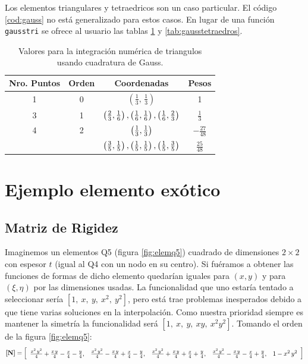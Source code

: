 Los elementos triangulares y tetraedricos son un caso particular. El código \ref{cod:gauss} no está generalizado para estos casos. En lugar de una función \texttt{gausstri} se ofrece al usuario las tablas \ref{tab:gausstriangulos} y \ref{tab:gausstetraedros}.


\begin{table}[htb!]
	\centering
	\begin{tabular}{cccc}
		Nro. Puntos & Orden & Coordenadas & Pesos \\ \hline \hline
		1 & 0 & \( \left(\frac{1}{3}, \,\frac{1}{3} \right)\) & 1 \\ [1pt] \hline
		3 & 1 & \(  \left(\frac{2}{3},\frac{1}{6}\right), \left(\frac{1}{6},\frac{1}{6}\right), \left(\frac{1}{6},\frac{2}{3} \right) \) & \( \frac{1}{3}\) \\ [2pt]\hline
		4 & 2 & \( \left(\frac{1}{3}, \frac{1}{3}\right)\) & \( -\frac{27}{48}\)   \\[5pt]
		&   &  \( \left(\frac{3}{5},\frac{1}{5}\right),\left(\frac{1}{5},\frac{1}{5}\right),\left(\frac{1}{5},\frac{3}{5}\right)  \) & \(\frac{25}{48}\)
	\end{tabular}
	\caption{Valores para la integración numérica de triangulos usando cuadratura de Gauss.}
	\label{tab:gausstriangulos}
\end{table}



\section*{Ejemplo elemento exótico}
\subsection*{Matriz de Rigidez}
Imaginemos un elementos Q5 (figura \ref{fig:elemq5}) cuadrado de dimensiones $2\times2$ con espesor $t$  (igual al Q4 con un nodo en su centro). Si fuéramos a obtener las funciones de formas de dicho elemento quedarían iguales para $(x,y)$ y para $(\xi,\eta)$ por las dimensiones usadas. La funcionalidad que uno estaría tentado a seleccionar sería $[1,\ x, \ y,\ x^2, \ y^2 ]$, pero está trae problemas inesperados debido a que tiene varias soluciones en la interpolación. Como nuestra prioridad siempre es mantener la simetría la funcionalidad será $[1,\ x,\ y,\ xy,\ x^2y^2 ]$.  Tomando el orden de la figura \ref{fig:elemq5}:
\[
\boldsymbol{[}\mathbf{N} \boldsymbol{]}=\left[\begin{array}{ccccc} \frac{x^2\,y^2}{4}+\frac{x\,y}{4}-\frac{x}{4}-\frac{y}{4}, & \frac{x^2\,y^2}{4}-\frac{x\,y}{4}+\frac{x}{4}-\frac{y}{4}, & \frac{x^2\,y^2}{4}+\frac{x\,y}{4}+\frac{x}{4}+\frac{y}{4}, & \frac{x^2\,y^2}{4}-\frac{x\,y}{4}-\frac{x}{4}+\frac{y}{4}, & 1-x^2\,y^2 \end{array}\right]
\]

